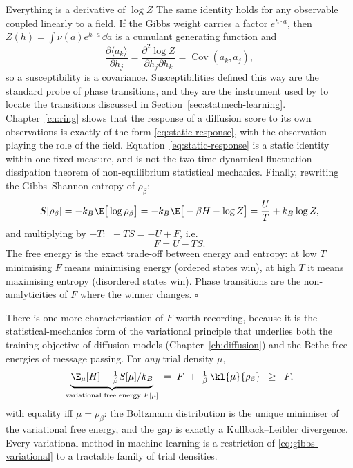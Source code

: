 \begin{toolbox}{Everything is a derivative of $\log Z$}
The same identity holds for any observable coupled linearly to a field. If the
Gibbs weight carries a factor $e^{h \cdot a}$, then
$Z(h) = \int \nu(a) e^{h\cdot a}\,\dd a$ is a cumulant generating function and
\begin{equation}
  \frac{\partial \langle a_k \rangle}{\partial h_j}
  = \frac{\partial^2 \log Z}{\partial h_j \partial h_k}
  = \operatorname{Cov}(a_k, a_j) ,
  \label{eq:static-response}
\end{equation}
so a susceptibility is a covariance. Susceptibilities defined this way are the
standard probe of phase transitions, and they are the instrument used by
\citet{bachtis2024cascade} to locate the transitions discussed in
Section~\ref{sec:statmech-learning}. Chapter~\ref{ch:ring} shows that the
response of a diffusion score to its own observations is exactly of the form
\eqref{eq:static-response}, with the observation playing the role of the field.
Equation~\eqref{eq:static-response} is a static identity within one fixed
measure, and is not the two-time dynamical fluctuation--dissipation theorem of
non-equilibrium statistical mechanics.
Finally, rewriting the Gibbs--Shannon entropy of $\rho_\beta$:
\begin{equation*}
  S[\rho_\beta]
  = -k_B \E\big[\log \rho_\beta\big]
  = -k_B \E\big[-\beta H - \log Z\big]
  = \frac{U}{T} + k_B \log Z ,
\end{equation*}
and multiplying by $-T$: $\; -TS = -U + F$, i.e.
\begin{equation*}
  F = U - TS .
\end{equation*}
The free energy is the exact trade-off between energy and entropy: at low
$T$ minimising $F$ means minimising energy (ordered states win), at high
$T$ it means maximising entropy (disordered states win). Phase
transitions are the non-analyticities of $F$ where the winner changes.
\hfill$\square$
\end{toolbox}

There is one more characterisation of $F$ worth recording, because it is
the statistical-mechanics form of the variational principle that
underlies both the training objective of diffusion models
(Chapter~\ref{ch:diffusion}) and the Bethe free energies of message
passing. For \emph{any} trial density $\mu$,
\begin{equation}
  \underbrace{\E_\mu[H] - \tfrac{1}{\beta} S[\mu]/k_B}_{\text{variational free energy } F[\mu]}
  \;=\; F \;+\; \tfrac{1}{\beta}\, \kl{\mu}{\rho_\beta}
  \;\;\geq\;\; F ,
  \label{eq:gibbs-variational}
\end{equation}
with equality iff $\mu = \rho_\beta$: the Boltzmann distribution is the
unique minimiser of the variational free energy, and the gap is exactly a
Kullback--Leibler divergence. Every variational method in machine
learning is a restriction of \eqref{eq:gibbs-variational} to a tractable
family of trial densities.

